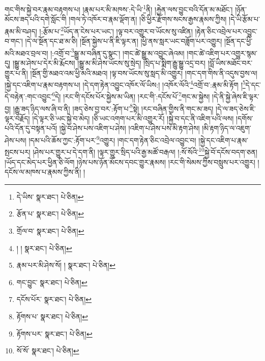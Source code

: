 གང་གིས་སྐྱེ་བར་རྣམ་བརྟགས་པ། །རྣམ་པར་མི་མཁས་:དེ་ཡི་\footnote{དེ་ཡིས་  སྣར་ཐང་།  པེ་ཅིན། }ནི། །རྐྱེན་ལས་བྱུང་བའི་དོན་མ་མཐོང་། །ཉོན་མོངས་ཟད་པའི་དགེ་སློང་གི །གལ་ཏེ་འཁོར་བ་རྣམ་ལྡོག་ན། །ཅི་ཕྱིར་རྫོགས་སངས་རྒྱས་རྣམས་ཀྱིས། །དེ་ཡི་རྩོམ་པ་རྣམ་མི་བཤད། །:རྩོམ་པ་\footnote{རྩོན་པ་  སྣར་ཐང་།  པེ་ཅིན། }ཡོད་ན་ངེས་པར་ཡང་། །ལྟ་བར་འགྱུར་བ་ཡོངས་སུ་འཛིན། །རྟེན་ཅིང་འབྲེལ་པར་འབྱུང་བ་གང་། །དེ་ལ་སྔོན་དང་ཐ་མ་ཅི། །སྔོན་སྐྱེས་པ་ནི་ཇི་ལྟར་ན། །ཕྱི་ནས་སླར་ཡང་བཟློག་པར་འགྱུར། །སྔོན་དང་ཕྱི་མའི་མཐའ་བྲལ་བ། །:འགྲོ་བ་\footnote{གྲོལ་བ་  སྣར་ཐང་།  པེ་ཅིན། }སྒྱུ་མ་བཞིན་དུ་སྣང་། །གང་ཚེ་སྒྱུ་མ་འབྱུང་ཞེའམ། །གང་ཚེ་འཇིག་པར་འགྱུར་སྙམ་དུ། །སྒྱུ་མ་ཤེས་པ་དེར་མི་རྨོངས། །སྒྱུ་མ་མི་ཤེས་ཡོངས་སུ་སྲེད། །སྲིད་པ་སྨིག་རྒྱུ་སྒྱུ་འདྲ་བར། །བློ་ཡིས་མཐོང་བར་གྱུར་པ་ནི། །སྔོན་གྱི་མཐའ་འམ་ཕྱི་མའི་མཐའ། །ལྟ་བས་ཡོངས་སུ་སླད་མི་འགྱུར། །གང་དག་གིས་ནི་འདུས་བྱས་ལ། །སྐྱེ་དང་འཇིག་པ་རྣམ་བརྟགས་པ། །དེ་དག་རྟེན་འབྱུང་འཁོར་ལོ་ཡིས:། །འཁོར་ལོའི་\footnote{། །  སྣར་ཐང་།  པེ་ཅིན། }འགྲོ་བ་:རྣམ་མི་རྟོག །\footnote{རྣམ་པར་མི་ཤེས་སོ། །  སྣར་ཐང་།  པེ་ཅིན། }དེ་དང་དེ་བརྟེན་:གང་འབྱུང་\footnote{གང་བྱུང་  སྣར་ཐང་།  པེ་ཅིན། }དེ། །རང་གི་དངོས་པོར་སྐྱེས་མ་ཡིན། །རང་གི་:དངོས་པོ་\footnote{དངོས་པོར་  སྣར་ཐང་།  པེ་ཅིན། }གང་མ་སྐྱེས། །དེ་ནི་སྐྱེ་ཞེས་ཇི་ལྟར་བྱ། །རྒྱུ་ཟད་ཉིད་ལས་ཞི་བ་ནི། །ཟད་ཅེས་བྱ་བར་:རྟོག་པ་\footnote{རྟོགས་པ་  སྣར་ཐང་།  པེ་ཅིན། }སྟེ། །རང་བཞིན་གྱིས་ནི་གང་མ་ཟད། །དེ་ལ་ཟད་ཅེས་ཇི་ལྟར་བརྗོད། །དེ་ལྟར་ཅི་ཡང་སྐྱེ་བ་མེད། །ཅི་ཡང་འགག་པར་མི་འགྱུར་རོ། །སྐྱེ་བ་དང་ནི་འཇིག་པའི་ལས། །དགོས་པའི་དོན་དུ་བསྟན་པའོ། །སྐྱེ་བ་ཤེས་པས་འཇིག་པ་ཤེས། །འཇིག་པ་ཤེས་པས་མི་རྟག་ཤེས། །མི་རྟག་ཉིད་ལ་འཇུག་ཤེས་པས། །དམ་པའི་ཆོས་ཀྱང་:རྟོག་པར་\footnote{རྟོགས་པར་  སྣར་ཐང་།  པེ་ཅིན། }འགྱུར། །གང་དག་རྟེན་ཅིང་འབྲེལ་འབྱུང་བ། །སྐྱེ་དང་འཇིག་པ་རྣམ་སྤངས་པར། །ཤེས་པར་གྱུར་པ་དེ་དག་ནི། །ལྟར་གྱུར་སྲིད་པའི་རྒྱ་མཚོ་བརྒལ། །:སོ་སོའི་\footnote{སོ་སོ་  སྣར་ཐང་།  པེ་ཅིན། }སྐྱེ་བོ་དངོས་བདག་ཅན། །ཡོད་དང་མེད་པར་ཕྱིན་ཅི་ལོག །ཉེས་པས་ཉོན་མོངས་དབང་གྱུར་རྣམས། །རང་གི་སེམས་ཀྱིས་བསླུས་པར་འགྱུར། །དངོས་ལ་མཁས་པ་རྣམས་ཀྱིས་ནི། །
